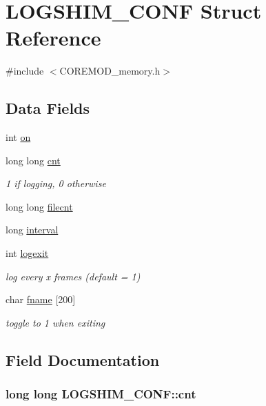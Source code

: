 \hypertarget{structLOGSHIM__CONF}{\section{L\+O\+G\+S\+H\+I\+M\+\_\+\+C\+O\+N\+F Struct Reference}
\label{structLOGSHIM__CONF}
}


{\ttfamily \#include $<$C\+O\+R\+E\+M\+O\+D\+\_\+memory.\+h$>$}

\subsection*{Data Fields}
\begin{DoxyCompactItemize}
\item 
int \hyperlink{structLOGSHIM__CONF_a399b782abca4a24ae8e5a3c11ac9bc48}{on}
\item 
long long \hyperlink{structLOGSHIM__CONF_af89423462a4010b5213f9687f354a548}{cnt}
\begin{DoxyCompactList}\small\item\em 1 if logging, 0 otherwise \end{DoxyCompactList}\item 
long long \hyperlink{structLOGSHIM__CONF_a540e125719be22adb4d4d1c1c87f575d}{filecnt}
\item 
long \hyperlink{structLOGSHIM__CONF_af4a9410a1d66d15e10df76223aeccb50}{interval}
\item 
int \hyperlink{structLOGSHIM__CONF_ade9849e9a2d4a6973b891d0ba46724ed}{logexit}
\begin{DoxyCompactList}\small\item\em log every x frames (default = 1) \end{DoxyCompactList}\item 
char \hyperlink{structLOGSHIM__CONF_ac44b39d0e50c234b7e0667fed1e2f6ba}{fname} \mbox{[}200\mbox{]}
\begin{DoxyCompactList}\small\item\em toggle to 1 when exiting \end{DoxyCompactList}\end{DoxyCompactItemize}


\subsection{Field Documentation}
\hypertarget{structLOGSHIM__CONF_af89423462a4010b5213f9687f354a548}{
\subsubsection[{cnt}]{\setlength{\rightskip}{0pt plus 5cm}long long L\+O\+G\+S\+H\+I\+M\+\_\+\+C\+O\+N\+F\+::cnt}}\label{structLOGSHIM__CONF_af89423462a4010b5213f9687f354a548}


